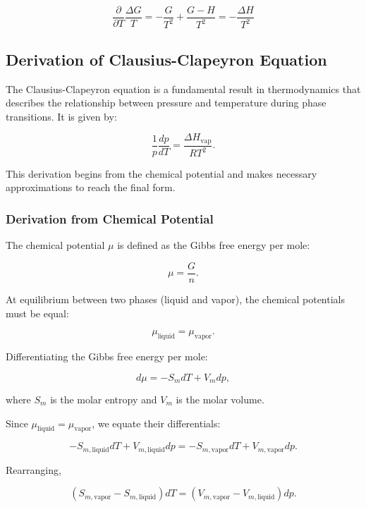 \documentclass{article}
\theoremstyle{definition}
\begin{document}
\[
\frac{\partial}{\partial T} \frac{\Delta G}{T} = -\frac{G}{T^2} + \frac{G-H}{T^2} = -\frac{\Delta H}{T^2}
\]
\subsection{Derivation of Clausius-Clapeyron Equation}
The Clausius-Clapeyron equation is a fundamental result in thermodynamics that describes the relationship between pressure and temperature during phase transitions. It is given by:

\begin{equation}
\frac{1}{p} \frac{dp}{dT} = \frac{\Delta H_{\text{vap}}}{RT^2}.
\end{equation}

This derivation begins from the chemical potential and makes necessary approximations to reach the final form.

\subsubsection{Derivation from Chemical Potential}
The chemical potential \( \mu \) is defined as the Gibbs free energy per mole:

\begin{equation}
\mu = \frac{G}{n}.
\end{equation}

At equilibrium between two phases (liquid and vapor), the chemical potentials must be equal:

\begin{equation}
\mu_{\text{liquid}} = \mu_{\text{vapor}}.
\end{equation}

Differentiating the Gibbs free energy per mole:

\begin{equation}
d\mu = -S_m dT + V_m dp,
\end{equation}

where \( S_m \) is the molar entropy and \( V_m \) is the molar volume.

Since \( \mu_{\text{liquid}} = \mu_{\text{vapor}} \), we equate their differentials:

\begin{equation}
-S_{m,\text{liquid}} dT + V_{m,\text{liquid}} dp = -S_{m,\text{vapor}} dT + V_{m,\text{vapor}} dp.
\end{equation}

Rearranging,

\begin{equation}
(S_{m,\text{vapor}} - S_{m,\text{liquid}}) dT = (V_{m,\text{vapor}} - V_{m,\text{liquid}}) dp.
\end{equation}
\end{document}
